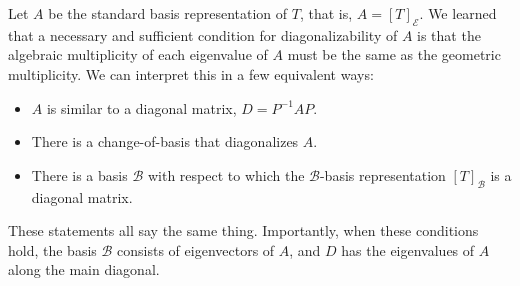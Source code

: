 \documentclass[fleqn,11pt]{paper}
\theoremstyle{remark}
\newcommand{\<}{\ensuremath{\langle}}
\renewcommand{\>}{\ensuremath{\rangle}}
\newcommand\sB{\ensuremath{\mathcal B}}
\newcommand\sE{\ensuremath{\mathcal E}}
\begin{document}
Let $A$ be the standard basis representation of $T$, that is, $A = [T]_\sE$.   
We learned that a necessary and sufficient condition for diagonalizability
of $A$ is that the algebraic multiplicity of each eigenvalue of $A$ must be 
the same as the geometric multiplicity.
We can interpret this in a few equivalent ways: 
\begin{itemize}
\item $A$ is similar to a diagonal matrix, $D = P^{-1} A P$.
\item There is a change-of-basis that diagonalizes $A$.
\item There is a basis $\sB$ with respect to which
the $\sB$-basis representation $[T]_\sB$ is a diagonal matrix.
\end{itemize}
These statements all say the same thing.  Importantly, when these 
conditions hold, the basis $\sB$ consists of eigenvectors of 
$A$, and $D$ has the eigenvalues of $A$ along the main diagonal.
\end{document}
